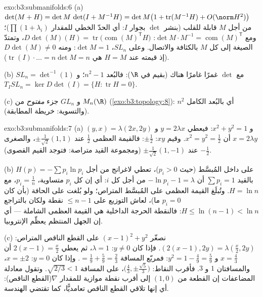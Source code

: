 \begin{solution}{exo:b3:submanifolds:6}
(a) $\det(M + H) = \det M\,\det(I + M^{-1}H) = \det M\bigl(1
+ \operatorname{tr}(M^{-1}H) + O(\norm H^2)\bigr)$ من أجل $M$ قابلة للقلب (بنشر $\det$ بجوار $I$: أي
الحدّ الخطي للمقدار $\prod(1 + \lambda_i)$)؛ ومع $\det M\cdot M^{-1} =
\operatorname{com}(M)^{\mathsf T}$: $D\det(M)(H) = \operatorname{tr}\bigl(\operatorname{com}
(M)^{\mathsf T}H\bigr)$، وتمتدّ الصيغة
إلى كل $M$ بالكثافة والاتصال. وعلى $SL_n$، $\det M = 1$:
ومنه $D\det(M) \ne 0$ (إذ قيمته عند $H = M$ هي $\operatorname{tr}(I)\cdot\dots = n\det M = n$).

(b) $SL_n = \det^{-1}(1)$ مع $\det$ غمرًا غامرًا هناك (بقيم في $\R$): فالبُعد
$n^2 - 1$؛ و $T_ISL_n = \ker
D\det(I) = \{H : \operatorname{tr}H = 0\}$.

(c) و $GL_n$ جزء \emph{مفتوح} من $M_n(\R)$ (\cref{exo:b3:topology:8}): أي
 بالبُعد الكامل $n^2$ (والتسوية: خريطة المطابقة).
\end{solution}

\begin{solution}{exo:b3:submanifolds:7}
(a) $(y, x) = \lambda(2x, 2y)$ و $x^2 + y^2 = 1$: فيعطي $y =
2\lambda x$ و $x = 2\lambda y$
أن $x^2 = y^2 = \frac12$. وقيم $xy$: $\pm\frac12$: فالقيمة العظمى $\frac12$
عند $\pm\frac1{\sqrt2}(1,1)$، والصغرى $-\frac12$ عند $\pm\frac1{\sqrt2}(1,-1)$ (ومجموعة القيد
متراصة: فتوجد القيم القصوى).

(b) على داخل المُبسَّط (حيث $p_i > 0$)، تعطي لاغرانج من أجل
$H(p) = -\sum p_i\ln p_i$ بالقيد $\sum p_i = 1$ أن $-\ln p_i - 1 = \lambda$ من أجل كل $i$: أي إن كل
$p_i$ متساوية، $p_i =
\frac1n$، مع $H = \ln n$. وتُبلَغ القيمة العظمى
على المُبسَّط المتراص؛ ولو بُلغت على الحافة (بأن كان $p_i = 0$
ما)، لعاش التوزيع على $\leq n - 1$ نقطة ولكان بالتراجع $H \leq \ln(n-1) < \ln n$:
فالنقطة الحرجة الداخلية هي القيمة العظمى الشاملة --- أي إن
الجهل المنتظم يعظّم الإنتروبيا.

(c) نصغّر $(x-1)^2 + y^2$ على القطع الناقص المتراص: $(2(x{-}1), 2y) = \lambda(\frac x2, 2y)$. فإذا
كان $y \neq 0$: $\lambda = 1$، ثم يعطي $2(x - 1) = \frac x2$ أن $x =
\frac43$ و $y^2 = 1 - \frac49 = \frac59$:
فمربّع المسافة $=
\frac19 + \frac59 = \frac23$. وإذا كان $y = 0$: $x = \pm2$، والمسافتان
$1$ و $3$. فأقرب النقاط: $\bigl(\frac43,
\pm\frac{\sqrt5}3\bigr)$، على المسافة
$\sqrt{2/3} < 1$. وتقول معادلة المضاعفات إن القطعة من $(1,0)$
إلى أقرب نقطة موازية للمقدار $\nabla$(القطع الناقص): أي إنها تلاقي القطع
الناقص تعامديًّا، كما تقتضي الهندسة.
\end{solution}

